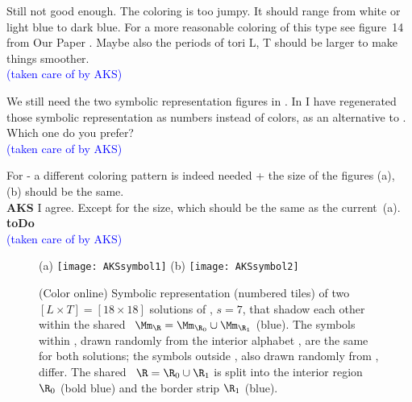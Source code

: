 \begin{description}

  {
Still not good enough. The coloring is too jumpy.   It should range from
white or light blue to dark blue. For a  more reasonable coloring  of
this type see figure~14 from Our Paper .
Maybe also the periods of tori L, T  should be larger to make things
smoother.
\\ \textcolor{blue}{(taken care of by AKS)}
        }

  {
 We still need the two symbolic representation figures in
.
In  I have regenerated those symbolic
representation as numbers instead of colors, as an alternative to
. Which one do you prefer?
\\ \textcolor{blue}{(taken care of by AKS)}
        }

  {	
For  - a different coloring pattern is indeed needed
+ the size of the figures (a), (b) should be the same.
\\
{\bf AKS}
I agree. Except for the size, which should be the same as the current
\,(a).
\\ {\bf toDo}
\\ \textcolor{blue}{(taken care of by AKS)}
    }

\begin{figure}
\begin{center}
(a) \texttt{[image: AKSsymbol1]}
(b) \texttt{[image: AKSsymbol2]}
\end{center}
\caption[]{
(Color online)
Symbolic representation (numbered tiles) of two
$[L\!\times\!T] = [18 \times 18]$
{\twot} solutions of
,
$s=7$,
that shadow each other within the shared
\brick\ $\Mm_{\R}=\Mm_{\R_{0}} \cup \Mm_{\R_{1}}$ (blue).
The symbols within \R, drawn randomly from the interior alphabet \Ai, are
the same for both solutions;
the symbols outside \R, also drawn randomly from \Ai, differ.
The shared \brick\ $\R=\R_{0} \cup \R_{1}$ is split into the interior region
$\R_{0}$ (bold blue) and the border strip $\R_{1}$ (blue).
}
\label{fig:AKSsymbol}  %
\end{figure}


\end{description}
